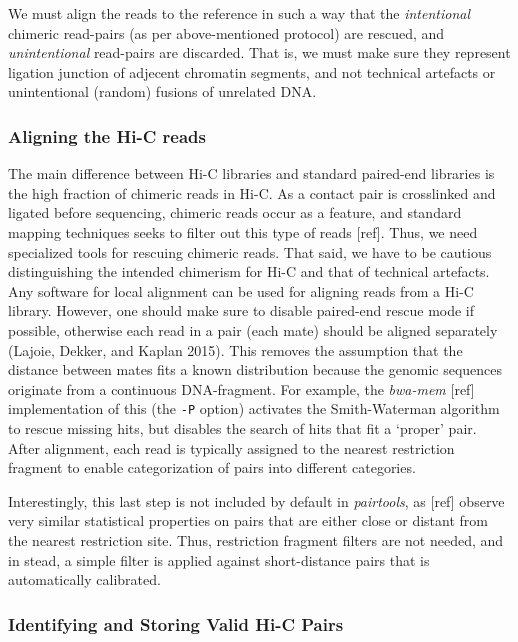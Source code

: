 \documentclass[
  11pt,
  a4paper,
]{scrbook}
\let\oldemph\emph
\renewcommand\emph[1]{\oldemph{\color{gray}#1}}
\begin{document}
We must align the reads to the reference in such a way that the
\emph{intentional} chimeric read-pairs (as per above-mentioned protocol)
are rescued, and \emph{unintentional} read-pairs are discarded. That is,
we must make sure they represent ligation junction of adjecent chromatin
segments, and not technical artefacts or unintentional (random) fusions
of unrelated DNA.

\subsubsection{Aligning the Hi-C reads}\label{aligning-the-hi-c-reads}

The main difference between Hi-C libraries and standard paired-end
libraries is the high fraction of chimeric reads in Hi-C. As a contact
pair is crosslinked and ligated before sequencing, chimeric reads occur
as a feature, and standard mapping techniques seeks to filter out this
type of reads {[}ref{]}. Thus, we need specialized tools for rescuing
chimeric reads. That said, we have to be cautious distinguishing the
intended chimerism for Hi-C and that of technical artefacts. Any
software for local alignment can be used for aligning reads from a Hi-C
library. However, one should make sure to disable paired-end rescue mode
if possible, otherwise each read in a pair (each mate) should be aligned
separately (Lajoie, Dekker, and Kaplan 2015). This removes the
assumption that the distance between mates fits a known distribution
because the genomic sequences originate from a continuous DNA-fragment.
For example, the \emph{bwa-mem} {[}ref{]} implementation of this (the
\texttt{-P} option) activates the Smith-Waterman algorithm to rescue
missing hits, but disables the search of hits that fit a `proper' pair.
After alignment, each read is typically assigned to the nearest
restriction fragment to enable categorization of pairs into different
categories.

Interestingly, this last step is not included by default in
\emph{pairtools}, as {[}ref{]} observe very similar statistical
properties on pairs that are either close or distant from the nearest
restriction site. Thus, restriction fragment filters are not needed, and
in stead, a simple filter is applied against short-distance pairs that
is automatically calibrated.

\subsubsection{Identifying and Storing Valid Hi-C
Pairs}\label{identifying-and-storing-valid-hi-c-pairs}
\end{document}
